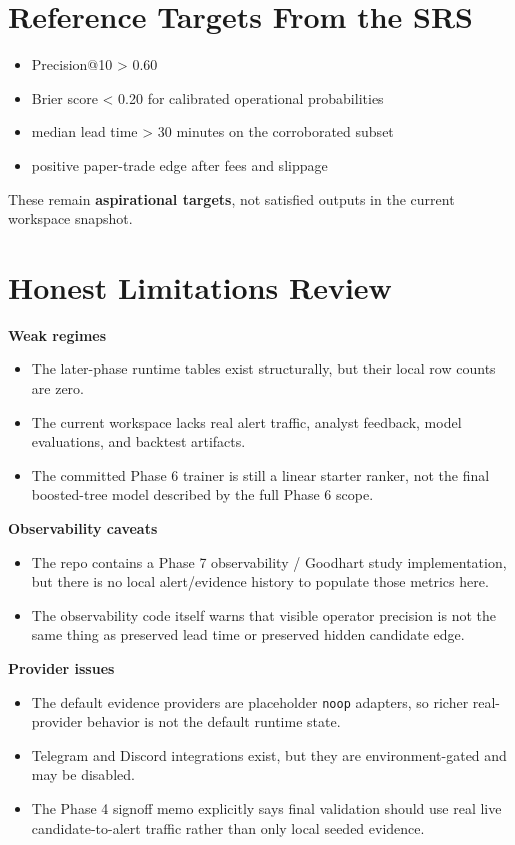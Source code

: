 \documentclass{article}
\begin{document}
\section*{Reference Targets From the SRS}
\begin{itemize}
\item Precision@10 \textgreater{} 0.60
\item Brier score \textless{} 0.20 for calibrated operational probabilities
\item median lead time \textgreater{} 30 minutes on the corroborated subset
\item positive paper-trade edge after fees and slippage
\end{itemize}

These remain \textbf{aspirational targets}, not satisfied outputs in the current workspace snapshot.

\section*{Honest Limitations Review}
\textbf{Weak regimes}
\begin{itemize}
\item The later-phase runtime tables exist structurally, but their local row counts are zero.
\item The current workspace lacks real alert traffic, analyst feedback, model evaluations, and backtest artifacts.
\item The committed Phase 6 trainer is still a linear starter ranker, not the final boosted-tree model described by the full Phase 6 scope.
\end{itemize}

\textbf{Observability caveats}
\begin{itemize}
\item The repo contains a Phase 7 observability / Goodhart study implementation, but there is no local alert/evidence history to populate those metrics here.
\item The observability code itself warns that visible operator precision is not the same thing as preserved lead time or preserved hidden candidate edge.
\end{itemize}

\textbf{Provider issues}
\begin{itemize}
\item The default evidence providers are placeholder \texttt{noop} adapters, so richer real-provider behavior is not the default runtime state.
\item Telegram and Discord integrations exist, but they are environment-gated and may be disabled.
\item The Phase 4 signoff memo explicitly says final validation should use real live candidate-to-alert traffic rather than only local seeded evidence.
\end{itemize}
\end{document}
